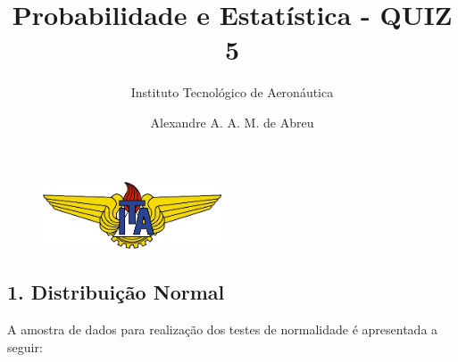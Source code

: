 \documentclass[
  letterpaper,
  DIV=11,
  numbers=noendperiod]{scrartcl}
\title{Probabilidade e Estatística - QUIZ 5}
\subtitle{Instituto Tecnológico de Aeronáutica}
\author{Alexandre A. A. M. de Abreu}
\date{}
\begin{document}
\maketitle
\ifdefined\Shaded\renewenvironment{Shaded}{\begin{tcolorbox}[enhanced, borderline west={3pt}{0pt}{shadecolor}, interior hidden, sharp corners, boxrule=0pt, breakable, frame hidden]}{\end{tcolorbox}}\fi

\begin{figure}

{\centering \includegraphics[width=2.08333in,height=\textheight]{images/ita.jpg}

}

\end{figure}

\hypertarget{distribuiuxe7uxe3o-normal}{%
\subsection{1. Distribuição Normal}\label{distribuiuxe7uxe3o-normal}}

A amostra de dados para realização dos testes de normalidade é
apresentada a seguir:
\end{document}
